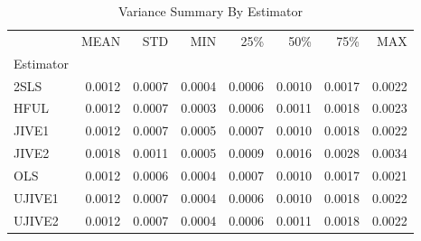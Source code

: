 \begin{table}[ht]
\centering
\caption{Variance Summary By Estimator}
\begin{tabular}{lrrrrrrr}
\toprule
 & MEAN & STD & MIN & 25\% & 50\% & 75\% & MAX \\
Estimator &  &  &  &  &  &  &  \\
\midrule
2SLS & 0.0012 & 0.0007 & 0.0004 & 0.0006 & 0.0010 & 0.0017 & 0.0022 \\
HFUL & 0.0012 & 0.0007 & 0.0003 & 0.0006 & 0.0011 & 0.0018 & 0.0023 \\
JIVE1 & 0.0012 & 0.0007 & 0.0005 & 0.0007 & 0.0010 & 0.0018 & 0.0022 \\
JIVE2 & 0.0018 & 0.0011 & 0.0005 & 0.0009 & 0.0016 & 0.0028 & 0.0034 \\
OLS & 0.0012 & 0.0006 & 0.0004 & 0.0007 & 0.0010 & 0.0017 & 0.0021 \\
UJIVE1 & 0.0012 & 0.0007 & 0.0004 & 0.0006 & 0.0010 & 0.0018 & 0.0022 \\
UJIVE2 & 0.0012 & 0.0007 & 0.0004 & 0.0006 & 0.0011 & 0.0018 & 0.0022 \\
\bottomrule
\end{tabular}
\end{table}
